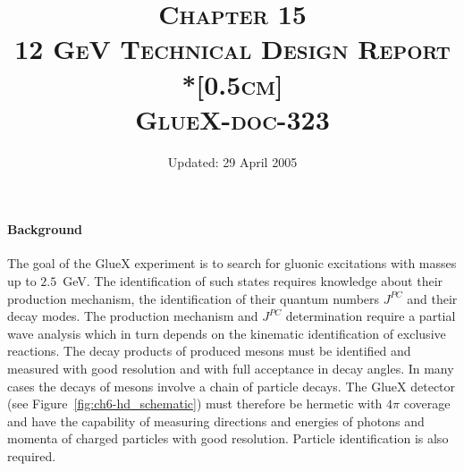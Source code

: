 
%
%
\title{\scshape{Chapter 15\\ 12 GeV Technical Design Report}\\*[0.5cm]
 \\
\small{GlueX-doc-323} \\
}
%
\date{Updated: 29 April 2005}
%
%

\maketitle
%
%
\paragraph{Background}
The goal of the GlueX experiment is to search for gluonic excitations
with masses up to $2.5$~GeV.  The identification of such states
requires knowledge about their production mechanism, the
identification of their quantum numbers $J^{PC}$ and their decay
modes. The production mechanism and $J^{PC}$ determination require a
partial wave analysis which in turn depends on the kinematic
identification of exclusive reactions. The decay products of produced
mesons must be identified and measured with good resolution and with
full acceptance in decay angles.  In many cases the decays of mesons
involve a chain of particle decays.  The GlueX detector (see
Figure~\ref{fig:ch6-hd_schematic}) must therefore be hermetic with 
$4\pi$ coverage and have the capability of measuring directions and
energies of photons and momenta of charged particles with good 
resolution.  Particle identification is also required.


